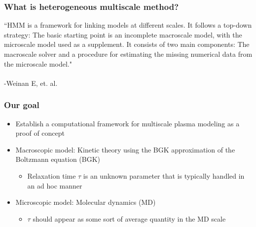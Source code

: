\documentclass{beamer}
\begin{document}
\begin{frame}
\frametitle{What is heterogeneous multiscale method?}
``HMM is a framework for linking models at different scales. It follows a top-down strategy: The basic starting point is an incomplete macroscale model, with the microscale model used as a supplement. It consists of two main components: The macroscale solver and a procedure for estimating the missing numerical data from the microscale model."\\\hfill\\\hfill -Weinan E, et. al.
\end{frame}

\begin{frame}
\frametitle{Our goal}
\begin{itemize}

\item Establish a computational framework for multiscale plasma modeling as a proof of concept
\vspace{1em}
\item Macroscopic model: Kinetic theory using the BGK approximation of the Boltzmann equation (BGK)
\vspace{1em}
\begin{itemize}
\item Relaxation time $\tau$ is an unknown parameter that is typically handled in an ad hoc manner
\end{itemize}
\vspace{1em}
\item Microscopic model: Molecular dynamics (MD)
\vspace{1em}
\begin{itemize}
\item $\tau$ should appear as some sort of average quantity in the MD scale
\end{itemize}



\end{itemize}
\end{frame}
\end{document}
